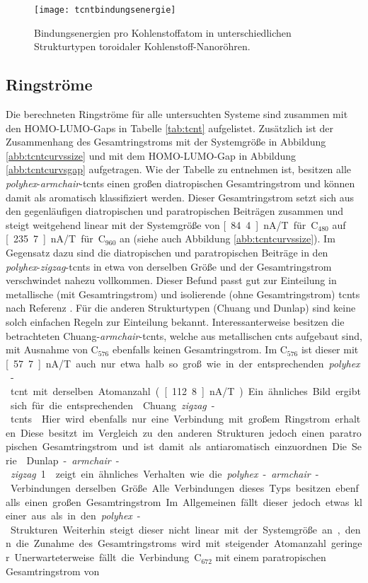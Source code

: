 \begin{figure}[ht!]
	\centering
	\texttt{[image: tcntbindungsenergie]}
	\captionsetup{figurewithin = chapter}
	\captionsetup{font=small, labelfont=bf}\caption[Bindungsenergien toroidaler Kohlenstoff-Nanoröhren]{Bindungsenergien pro Kohlenstoffatom in unterschiedlichen Strukturtypen toroidaler Kohlenstoff-Nanoröhren.}
\label{abb:tcntbindungsenergie}
\end{figure}

\subsection{Ringströme}

Die berechneten Ringströme für alle untersuchten Systeme sind zusammen mit den HOMO-LUMO-Gaps in Tabelle \ref{tab:tcnt} aufgelistet. Zusätzlich ist der Zusammenhang des Gesamtringstroms mit der Systemgröße in Abbildung \ref{abb:tcntcurvssize} und mit dem HOMO-LUMO-Gap in Abbildung \ref{abb:tcntcurvsgap} aufgetragen. Wie der Tabelle zu entnehmen ist, besitzen alle \textit{polyhex}-\textit{armchair}-\acp{tcnt} einen großen diatropischen Gesamtringstrom und können damit als aromatisch klassifiziert werden. Dieser Gesamtringstrom setzt sich aus den gegenläufigen diatropischen und paratropischen Beiträgen zusammen und steigt weitgehend linear mit der Systemgröße von \unit[84.4]{nA/T} für C$_{480}$ auf \unit[235.7]{nA/T} für C$_{960}$ an (siehe auch Abbildung \ref{abb:tcntcurvssize}). Im Gegensatz dazu sind die diatropischen und paratropischen Beiträge in den \textit{polyhex}-\textit{zigzag}-\acp{tcnt} in etwa von derselben Größe und der Gesamtringstrom verschwindet nahezu vollkommen. Dieser Befund passt gut zur Einteilung in metallische (mit Gesamtringstrom) und isolierende (ohne Gesamtringstrom) \acp{tcnt} nach Referenz \cite{zhang2005electronic}. Für die anderen Strukturtypen (Chuang und Dunlap) sind keine solch einfachen Regeln zur Einteilung bekannt. Interessanterweise besitzen die betrachteten \glqq Chuang-\textit{armchair}-\acp{tcnt}\grqq{}, welche aus metallischen \acp{cnt} aufgebaut sind, mit Ausnahme von C$_{576}$ ebenfalls keinen Gesamtringstrom. Im C$_{576}$ ist dieser mit \unit[57.7]{nA/T} auch nur etwa halb so groß wie in der entsprechenden \textit{polyhex}-\ac{tcnt} mit derselben Atomanzahl (\unit[112.8]{nA/T}). Ein ähnliches Bild ergibt sich für die entsprechenden \glqq Chuang \textit{zigzag}-\acp{tcnt}\grqq{}. Hier wird ebenfalls nur eine Verbindung mit großem Ringstrom erhalten. Diese besitzt im Vergleich zu den anderen Strukturen jedoch einen paratropischen Gesamtringstrom und ist damit als antiaromatisch einzuordnen. Die Serie \glqq Dunlap-\textit{armchair}-\textit{zigzag} 1\grqq{} zeigt ein ähnliches Verhalten wie die \textit{polyhex}-\textit{armchair}-Verbindungen derselben Größe. Alle Verbindungen dieses Typs besitzen ebenfalls einen großen Gesamtringstrom. Im Allgemeinen fällt dieser jedoch etwas kleiner aus als in den \textit{polyhex}-Strukturen. Weiterhin steigt dieser nicht linear mit der Systemgröße an, denn die Zunahme des Gesamtringstroms wird mit steigender Atomanzahl geringer. Unerwarteterweise fällt die Verbindung C$_{672}$ mit einem paratropischen Gesamtringstrom von 